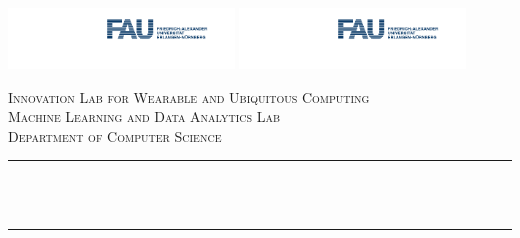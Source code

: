 \begin{titlepage}

\newcommand{\HRule}{\rule{\linewidth}{0.5mm}} %



\includegraphics[width = 6cm]{./figures/FAU_logo} 
\hspace{3cm}
\includegraphics[width = 6cm]{./figures/FAU_logo}\\[0.5cm] 

\begin{center} %

\textsc{\LARGE Innovation Lab for Wearable and Ubiquitous Computing}\\[1 cm] 
\textsc{\Large Machine Learning and Data Analytics Lab}\\[0.5cm] 
\textsc{\large Department of Computer Science}\\[0.5cm] 

\HRule \\[0.4cm]
{ \huge \bfseries \reporttitle}\\ %
\HRule \\[1.5cm]
\end{center}


\end{titlepage}
